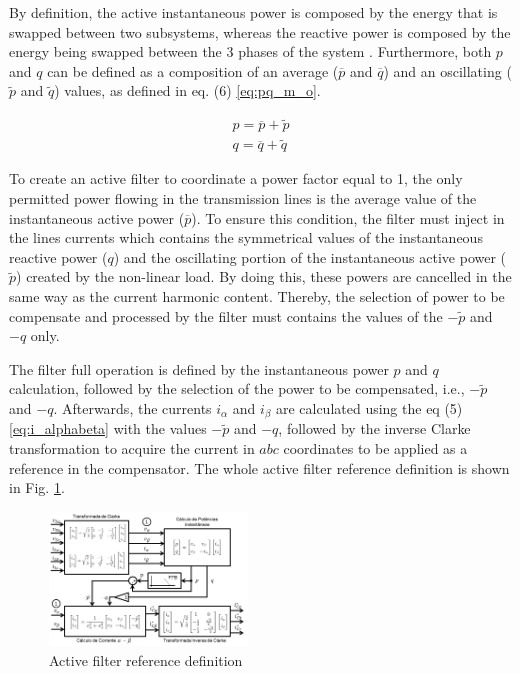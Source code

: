 By definition, the active instantaneous power is composed by the energy that is swapped between two subsystems, whereas the reactive power is composed by the energy being swapped between the 3 phases of the system \cite{Akagi}. Furthermore, both $p$ and $q$ can be defined as a composition of an average ($\overline{p}$ and $\overline{q}$) and an oscillating ($\tilde{p}$ and $\tilde{q}$) values, as defined in eq. (6) \ref{eq:pq_m_o}.

\begin{equation}
\begin{aligned}
p = \overline{p} + \tilde{p}\\
q = \overline{q} + \tilde{q} 
\end{aligned}
\label{eq:pq_m_o}
\end{equation} 

To create an active filter to coordinate a power factor equal to 1, the only permitted power flowing in the transmission lines is the average value of the instantaneous active power ($\overline{p}$). To ensure this condition, the filter must inject in the lines currents which contains the symmetrical values of the instantaneous reactive power ($q$) and the oscillating portion of the instantaneous active power ($\tilde{p}$) created by the non-linear load. By doing this, these powers are cancelled in the same way as the current harmonic content. Thereby, the selection of power to be compensate and processed by the filter must contains the values of the $-\tilde{p}$ and $-q$ only.

The filter full operation is defined by the instantaneous power $p$ and $q$ calculation, followed by the selection of the power to be compensated, i.e., $-\tilde{p}$ and $-q$. Afterwards, the currents $i_{\alpha}$ and $i_{\beta}$ are calculated using the eq (5) \ref{eq:i_alphabeta} with the values $-\tilde{p}$ and $-q$, followed by the inverse Clarke transformation to acquire the current in $abc$ coordinates to be applied as a reference in the compensator. The whole active filter reference definition is shown in Fig. \ref{fig:diagrama_filtro.png}.

\begin{figure}
	\centering
	\includegraphics[width=0.47\textwidth]{Figures/diagrama_filtro.png}
	\caption{Active filter reference definition}
	\label{fig:diagrama_filtro.png}
\end{figure}

